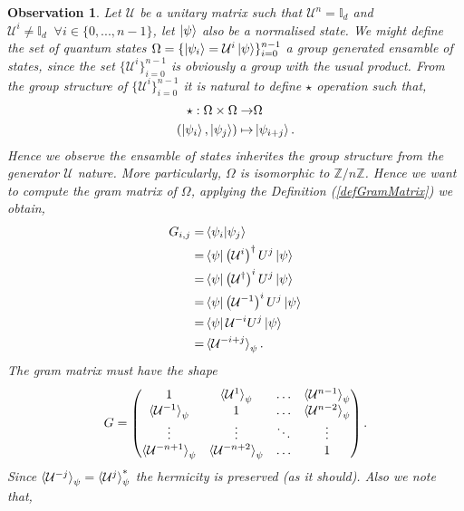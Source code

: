 \documentclass[12pt,letterpaper]{article}
\newtheorem{observation}{Observation}
\begin{document}
\begin{multicols}{2}
\begin{observation}
Let $\mathcal{U}$ be a unitary matrix such that $\mathcal{U}^n=\mathbb{I}_d$ and $\mathcal{U}^i\neq\mathbb{I}_d\;\;\forall i\in\{0,...,n-1\}$, let $\ket{\psi}$ also be a normalised state. We might define the set of quantum states $\Omega=\{\ket{\psi_i}=\mathcal{U}^i\ket{\psi}\}_{i=0}^{n-1}$ a group generated ensamble of states, since the set  $\{\mathcal{U}^i\}_{i=0}^{n-1}$ is obviously a group with the usual product. From the group structure of $\{\mathcal{U}^i\}_{i=0}^{n-1}$ it is natural to define $\star$ operation such that,
\begin{align}
\star:\Omega\times\Omega\rightarrow&\Omega\\
(\ket{\psi_i},\ket{\psi_j})\mapsto&\ket{\psi_{i+j}}.
\end{align}
Hence we observe the ensamble of states inherites the group structure from the generator $\mathcal{U}$ nature. More particularly, $\Omega$ is isomorphic to $\mathbb{Z}/n\mathbb{Z}$. Hence we want to compute the gram matrix of $\Omega$, applying the Definition (\ref{defGramMatrix}) we obtain,
\begin{align}
G_{i,j} =& \braket{\psi_{i}|\psi_{j}} \\
=& \bra{\psi} \left(\mathcal{U}^i\right)^\dagger U^j\ket{\psi}\\
=& \bra{\psi} \left(\mathcal{U}^\dagger\right)^i U^j\ket{\psi}\\
=& \bra{\psi} \left(\mathcal{U}^{-1}\right)^i U^j\ket{\psi}\\
=& \bra{\psi} \mathcal{U}^{-i} U^j\ket{\psi}\\
=& \braket{\mathcal{U}^{-i+j}}_\psi.
\end{align}
The gram matrix must have the shape
\begin{align}
G=\begin{pmatrix}
 1 & \braket{\mathcal{U}^{1}}_{\psi} & \hdots &  \braket{\mathcal{U}^{n-1}}_{\psi} \\
  \braket{\mathcal{U}^{-1}}_{\psi} & 1 & \hdots &  \braket{\mathcal{U}^{n-2}}_{\psi} \\
   \vdots & \vdots & \ddots & \vdots \\
  \braket{\mathcal{U}^{-n+1}}_{\psi} & \braket{\mathcal{U}^{-n+2}}_{\psi}  & \hdots &  1
\end{pmatrix}.
\end{align}
Since $\braket{\mathcal{U}^{-j}}_{\psi}=\braket{\mathcal{U}^{j}}_{\psi}^*$ the hermicity is preserved (as it should). Also we note that,

\end{observation}
\end{multicols}
\end{document}
